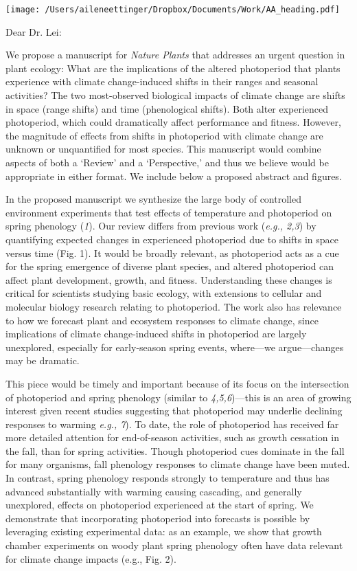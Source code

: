 \documentclass[10.5pt,a4paper]{letter}
\begin{document}
\begin{letter}{}
\texttt{[image: /Users/aileneettinger/Dropbox/Documents/Work/AA\_heading.pdf]}

\opening{Dear Dr. Lei:}
\par We propose a manuscript for \emph{Nature Plants} that addresses an urgent question in plant ecology: What are the implications
of the altered photoperiod that plants experience with climate change-induced shifts in their ranges and seasonal
activities? The two most-observed biological impacts of climate change are shifts in space (range shifts) and time (phenological shifts). Both alter experienced photoperiod, which could dramatically affect performance and fitness. However, the magnitude of effects from shifts in photoperiod with climate change are unknown or unquantified for most species. This manuscript would combine aspects of both a `Review' and a `Perspective,' and thus we believe would be appropriate in either format. We include below a proposed abstract and figures.

\par In the proposed manuscript we synthesize the large body of controlled environment experiments that test effects of temperature and photoperiod on spring phenology (\emph{1}). Our review differs from previous work  (\emph{e.g., 2,3}) by quantifying expected changes in experienced photoperiod due to shifts in space versus time (Fig. 1). It would be broadly relevant, as photoperiod acts as a cue for the spring emergence of diverse plant species, and altered photoperiod can affect plant development, growth, and fitness. Understanding these changes is critical for scientists studying basic ecology, with extensions to cellular and molecular biology research relating to photoperiod. The work also has relevance to how we forecast plant and ecosystem responses to climate change, since implications of climate change-induced shifts in photoperiod are largely unexplored, especially for early-season spring events, where---we argue---changes may be dramatic.

\par This piece would be timely and important because of its focus on the intersection of photoperiod and spring phenology (similar to \emph{4,5,6})---this is an area of growing interest given recent studies suggesting that photoperiod may underlie declining responses to warming \emph{e.g., 7}). To date, the role of photoperiod has received far more detailed attention for end-of-season activities, such as growth cessation in the fall, than for spring activities. Though photoperiod cues dominate in the fall for many organisms, fall phenology responses to climate change have been muted. In contrast, spring phenology responds strongly to temperature and thus has advanced substantially with warming causing cascading, and generally unexplored, effects on photoperiod experienced at the start of spring. We demonstrate that incorporating photoperiod into forecasts is possible by leveraging existing experimental data: as an example, we show that growth chamber experiments on woody plant spring phenology often have data relevant for climate change impacts (e.g., Fig. 2). 


\end{letter}
\end{document}
